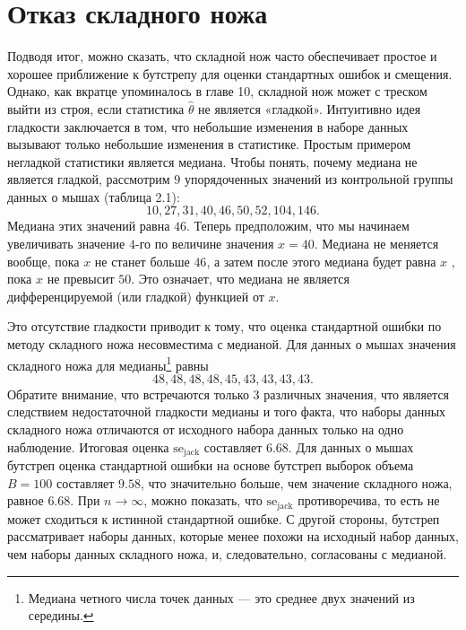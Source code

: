 \section{Отказ складного ножа}

Подводя итог, можно сказать, что складной нож часто обеспечивает простое и хорошее приближение к бутстрепу для оценки стандартных ошибок и смещения. Однако, как вкратце упоминалось в главе 10, складной нож может с треском выйти из строя, если статистика $\hat{\theta}$ не является «гладкой». Интуитивно идея гладкости заключается в том, что небольшие изменения в наборе данных вызывают только небольшие изменения в статистике. Простым примером негладкой статистики является медиана. Чтобы понять, почему медиана не является гладкой, рассмотрим $9$ упорядоченных значений из контрольной группы данных о мышах (таблица 2.1):
\begin{equation}\label{eq11.19}
    10,27,31,40,46,50,52,104,146.
\end{equation}
Медиана этих значений равна $46$. Теперь предположим, что мы начинаем увеличивать значение $4$-го по величине значения $x = 40$. Медиана не меняется вообще, пока $x$ не станет больше $46$, а затем после этого медиана будет равна $x$ , пока $x$ не превысит $50$. Это означает, что медиана не является дифференцируемой (или гладкой) функцией от $x$.

Это отсутствие гладкости приводит к тому, что оценка стандартной ошибки по методу складного ножа несовместима с медианой. Для данных о мышах значения складного ножа для медианы\footnote{Медиана четного числа точек данных --- это среднее двух значений из середины.} равны
\begin{equation}\label{eq11.20}
    48,48,48,48,45,43,43,43,43.
\end{equation}
Обратите внимание, что встречаются только $3$ различных значения, что является следствием недостаточной гладкости медианы и того факта, что наборы данных складного ножа отличаются от исходного набора данных только на одно наблюдение. Итоговая оценка $\mathrm{se}_{\mathrm{jack}}$ составляет $6.68$. Для данных о мышах бутстреп оценка стандартной ошибки на основе бутстреп выборок объема $B = 100$ составляет $9.58$, что значительно больше, чем значение складного ножа, равное $6.68$. При $n \rightarrow \infty$, можно показать, что $\mathrm{se}_{\mathrm{jack}}$ противоречива, то есть не может сходиться к истинной стандартной ошибке. С другой стороны, бутстреп рассматривает наборы данных, которые менее похожи на исходный набор данных, чем наборы данных складного ножа, и, следовательно, согласованы с медианой. 